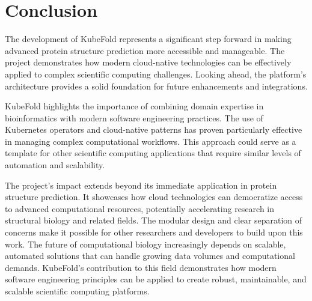 \section{Conclusion}

The development of KubeFold represents a significant step forward in making advanced protein structure prediction more accessible and manageable.
The project demonstrates how modern cloud-native technologies can be effectively applied to complex scientific computing challenges.
Looking ahead, the platform's architecture provides a solid foundation for future enhancements and integrations.

KubeFold highlights the importance of combining domain expertise in bioinformatics with modern software engineering practices.
The use of Kubernetes operators and cloud-native patterns has proven particularly effective in managing complex computational workflows.
This approach could serve as a template for other scientific computing applications that require similar levels of automation and scalability.

The project's impact extends beyond its immediate application in protein structure prediction.
It showcases how cloud technologies can democratize access to advanced computational resources, potentially accelerating research in structural biology and related fields.
The modular design and clear separation of concerns make it possible for other researchers and developers to build upon this work.
The future of computational biology increasingly depends on scalable, automated solutions that can handle growing data volumes and computational demands.
KubeFold's contribution to this field demonstrates how modern software engineering principles can be applied to create robust, maintainable, and scalable scientific computing platforms.